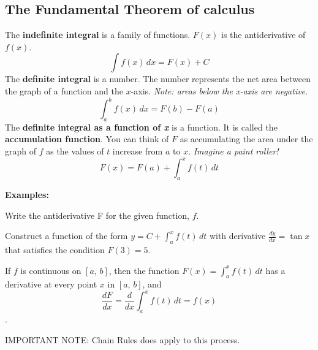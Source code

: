 \subsection*{The Fundamental Theorem of calculus}
The \textbf{indefinite integral} is a family of functions. $F(x)$ is the antiderivative of $f(x)$.
\[\int f(x)\,dx=F(x)+C\]
The \textbf{definite integral} is a number. The number represents the net area between the graph of a function and the $x$-axis. \textit{Note: areas below the x-axis are negative.}
\[\int_a^b f(x)\,dx=F(b)-F(a)\]
The \textbf{definite integral as a function of \textit{x}} is a function. It is called the \textbf{accumulation function}. You can think of $F$ as accumulating the area under the graph of $f$ as the values of $t$ increase from $a$ to $x$. \textit{Imagine a paint roller!}
\[F(x)=F(a)+\int_a^x f(t)\,dt\]

\textbf{Examples:}
\begin{questions}
    \question Write the antiderivative F for the given function, $f$.
    
    
    \question Construct a function of the form $y=\displaystyle C+ \int_a^x f(t)\,dt$ with derivative $\displaystyle\frac{dy}{dx}=\tan x$ that satisfies the condition $F(3)=5.$
    
\end{questions}

\newpage

\begin{tcolorbox}[title= DERIVATIVE OF THE INTEGRAL,colframe=black,sharp corners,colback=white,colbacktitle=white,coltitle=black,boxrule=1pt]

     If $f$ is continuous on $[a,\,b]$, then the function $\displaystyle F(x)=\int_a^x f(t)\,dt$ has a derivative at every point $x$ in $[a,\,b]$, and
     \[\frac{dF}{dx}=\frac{d}{dx}\int_a^x f(t)\,dt=f(x)\].
    
\end{tcolorbox}
\begin{center}
    IMPORTANT NOTE: Chain Rules does apply to this process.
\end{center}

